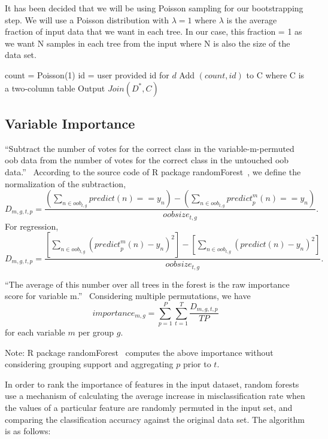 It has been decided that we will be using Poisson sampling for our bootstrapping step.
We will use a Poisson distribution with $\lambda=1$ where $\lambda$ is the average
fraction of input data that we want in each tree. In our case, this fraction = 1 as we want 
N samples in each tree from the input where N is also the size of the data set.
\\
\begin{algorithm}[Bootstrapping$(D^*)$]\label{alg:bootstrap}
  \begin{algorithmic}[1]
     \State count = Poisson(1)
     \State id = user provided id for $d$
     \State Add $(count, id)$ to C where C is a two-column table
    \EndFor
    \State Output $Join(D^*,C)$   
  \end{algorithmic}
\end{algorithm}

\subsection{Variable Importance}
``Subtract the number of votes for the correct class in the variable-m-permuted
oob data from the number of votes for the correct class in the untouched oob
data.''~\cite{random_forest_home}
According to the source code of R package randomForest~\cite{r_random_forest},
we define the normalization of the subtraction,
\[
D_{m,g,t,p} =
    \frac{
        \left( \sum_{n \in \mathit{oob}_{t,g}} \mathit{predict}(n) == y_n \right)
        - \left( \sum_{n \in \mathit{oob}_{t,g}} \mathit{predict}_p^m(n) == y_n \right)
    }{
        \mathit{oobsize}_{t,g}
    }.
\]
For regression,
\[
D_{m,g,t,p} =
    \frac{
        \left[ \sum_{n \in \mathit{oob}_{t,g}} \left( \mathit{predict}_p^m(n) - y_n \right)^2 \right]
        - \left[ \sum_{n \in \mathit{oob}_{t,g}} \left( \mathit{predict}(n) - y_n \right)^2 \right]
    }{
        \mathit{oobsize}_{t,g}
    }.
\]

``The average of this number over all trees in the forest is the raw importance
score for variable m.''~\cite{random_forest_home}
Considering multiple permutations, we have
\[
importance_{m,g} = \sum_{p=1}^P \sum_{t=1}^T \frac{D_{m,g,t,p}}{TP}
\]
for each variable $m$ per group $g$.

Note: R package randomForest~\cite{r_random_forest} computes the above
importance without considering grouping support and aggregating $p$ prior to
$t$.

In order to rank the importance of features in the input dataset, random forests
use a mechanism of calculating the average increase in misclassification rate
when the values of a particular feature are randomly permuted in the input set,
and comparing the classification accuracy against the original data set. 
The algorithm is as follows:


